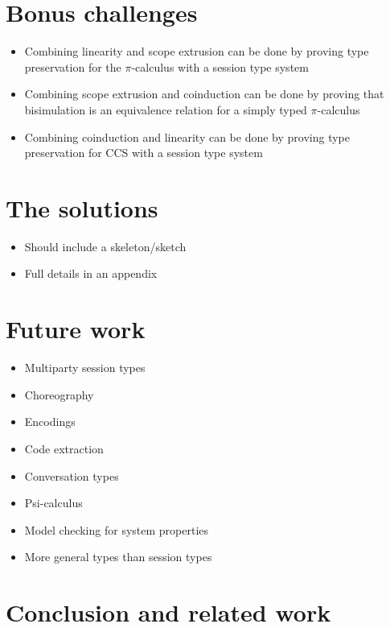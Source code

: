 \documentclass{article}
\begin{document}
\section{Bonus challenges}
\begin{itemize}
\item Combining linearity and scope extrusion can be done by proving type preservation for the \(\pi\)-calculus with a session type system
\item Combining scope extrusion and coinduction can be done by proving that bisimulation is an equivalence relation for a simply typed \(\pi\)-calculus
\item Combining coinduction and linearity can be done by proving type preservation for CCS with a session type system
\end{itemize}

\section{The solutions}
\begin{itemize}
\item Should include a skeleton/sketch
\item Full details in an appendix
\end{itemize}

\section{Future work}
\begin{itemize}
\item Multiparty session types
\item Choreography
\item Encodings
\item Code extraction
\item Conversation types
\item Psi-calculus
\item Model checking for system properties
\item More general types than session types
\end{itemize}

\section{Conclusion and related work}
\end{document}
